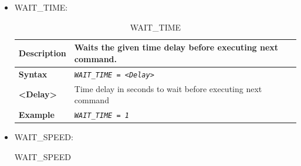 \begin{itemize}
\begin{longtable}{|l|l|}
			\hline \hline

		\end{longtable}

	\item WAIT\_TIME:

		\begin{longtable}{|l|l|}
		\caption{WAIT\_TIME}\\

			\hline

				\begin{minipage}[t]{0.22\linewidth} \textbf{Description} \end{minipage}
			&	\begin{minipage}[t]{0.78\linewidth} Waits the given time delay before executing next command. \end{minipage} \\

			\hline

				\begin{minipage}[t]{0.22\linewidth} \textbf{Syntax}	\end{minipage}
			&	\begin{minipage}[t]{0.78\linewidth} \emph{\texttt{WAIT\_TIME = <Delay>}} \end{minipage} \\

			\hline

				\begin{minipage}[t]{0.22\linewidth} \textbf{<Delay>} \end{minipage}
			&	\begin{minipage}[t]{0.78\linewidth} Time delay in seconds to wait before executing next command \end{minipage} \\

			\hline

				\begin{minipage}[t]{0.22\linewidth} \textbf{Example} \end{minipage}
			&	\begin{minipage}[t]{0.78\linewidth}	\emph{\texttt{WAIT\_TIME = 1}} \end{minipage} \\

			\hline \hline

		\end{longtable}

	\item WAIT\_SPEED:

		\begin{longtable}{|l|l|}
		\caption{WAIT\_SPEED}\\


\end{longtable}
\end{itemize}
